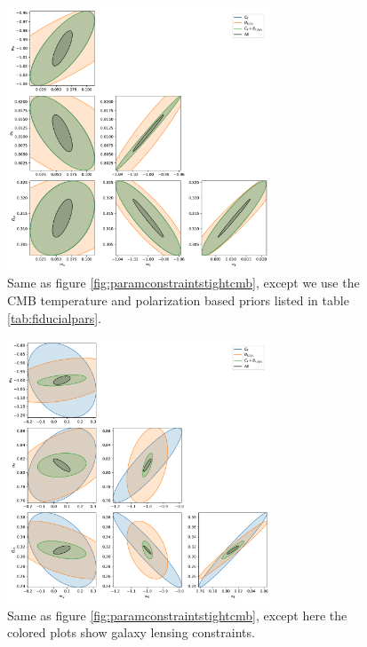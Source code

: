 \documentclass[11pt]{article} %
\begin{document}
\begin{figure}
    \centering
    \includegraphics[width=0.7\textwidth]{figures/param_constraints_tight_cmb_cmb_prior.pdf}
    \caption{Same as figure \ref{fig:paramconstraintstightcmb}, except we use the CMB temperature and polarization based priors listed in table \ref{tab:fiducialpars}.}
    \label{fig:paramconstraintstightcmbcmbprior}
\end{figure}

\begin{figure}
    \centering
    \includegraphics[width=0.7\textwidth]{figures/param_constraints_tight_gal_weak_prior.pdf}
    \caption{Same as figure \ref{fig:paramconstraintstightcmb}, except here the colored plots show galaxy lensing constraints.}
    \label{fig:paramconstraintstightgal}
\end{figure}
\end{document}
